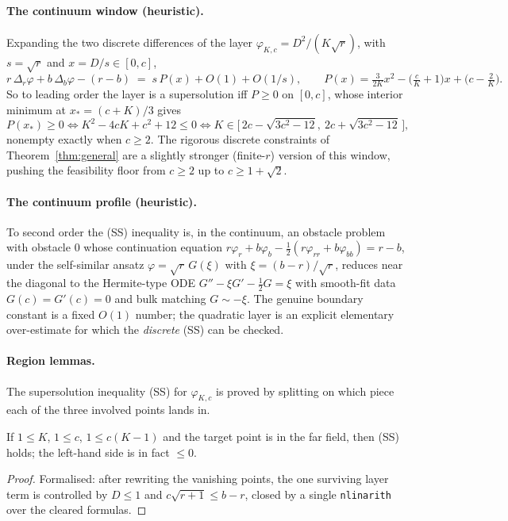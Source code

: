 \paragraph{The continuum window (heuristic).}
Expanding the two discrete differences of the layer $\varphi_{K,c}=D^2/(K\sqrt r)$,
with $s=\sqrt r$ and $x=D/s\in[0,c]$,
\[
  r\,\Delta_r\varphi+b\,\Delta_b\varphi-(r-b)\;=\;s\,P(x)+O(1)+O(1/s),
  \qquad
  P(x)=\tfrac{3}{2K}x^2-\big(\tfrac cK+1\big)x+\big(c-\tfrac2K\big).
\]
So to leading order the layer is a supersolution iff $P\ge0$ on $[0,c]$, whose
interior minimum at $x_*=(c+K)/3$ gives
\[
  P(x_*)\ge0\iff K^2-4cK+c^2+12\le0
  \iff K\in\big[\,2c-\sqrt{3c^2-12},\ 2c+\sqrt{3c^2-12}\,\big],
\]
nonempty exactly when $c\ge2$. The rigorous discrete constraints of
Theorem~\ref{thm:general} are a slightly stronger (finite-$r$) version of this
window, pushing the feasibility floor from $c\ge2$ up to $c\ge1+\sqrt2$.

\paragraph{The continuum profile (heuristic).}
To second order the (SS) inequality is, in the continuum, an obstacle problem with
obstacle $0$ whose continuation equation
$r\varphi_r+b\varphi_b-\tfrac12(r\varphi_{rr}+b\varphi_{bb})=r-b$, under the
self-similar ansatz $\varphi=\sqrt r\,G(\xi)$ with $\xi=(b-r)/\sqrt r$, reduces near
the diagonal to the Hermite-type ODE $G''-\xi G'-\tfrac12G=\xi$ with smooth-fit
data $G(c)=G'(c)=0$ and bulk matching $G\sim-\xi$. The genuine boundary constant is
a fixed $O(1)$ number; the quadratic layer is an explicit elementary
over-estimate for which the \emph{discrete} (SS) can be checked.

\paragraph{Region lemmas.}
The supersolution inequality (SS) for $\varphi_{K,c}$ is proved by splitting on
which piece each of the three involved points lands in.

\begin{proposition}\label{prop:ss_far}
\leanok
{}
If $1\le K$, $1\le c$, $1\le c(K-1)$ and the target point is in the far field, then
(SS) holds; the left-hand side is in fact $\le0$.
\end{proposition}
\begin{proof}\leanok Formalised: after rewriting the vanishing points, the one
surviving layer term is controlled by $D\le1$ and $c\sqrt{r+1}\le b-r$, closed by a
single \texttt{nlinarith} over the cleared formulas. \end{proof}

